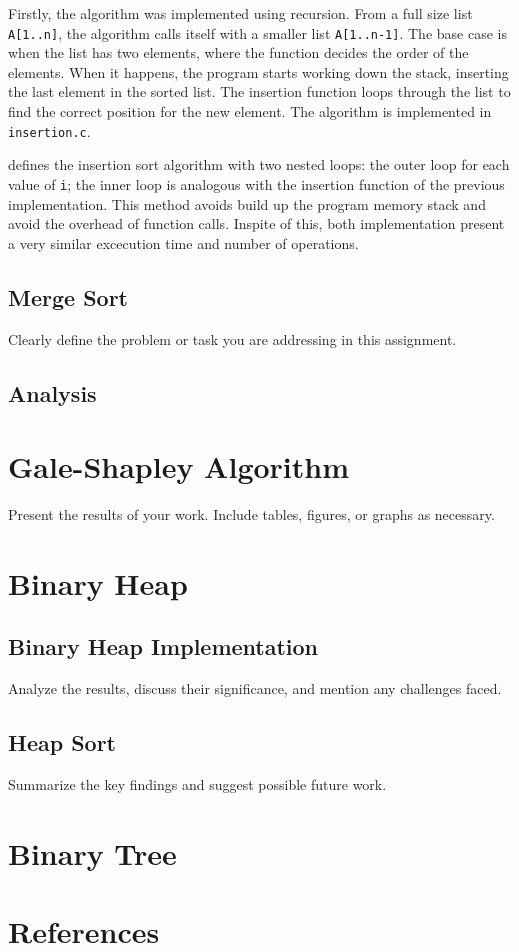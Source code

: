 \documentclass[a4paper,12pt,twocolumn]{article}
\begin{document}
Firstly, the algorithm was implemented using recursion. From a full size list \verb|A[1..n]|, the algorithm calls itself with a smaller list \verb|A[1..n-1]|. The base case is when the list has two elements, where the function decides the order of the elements. When it happens, the program starts working down the stack, inserting the last element in the sorted list. The insertion function loops through the list to find the correct position for the new element. The algorithm is implemented in \verb|insertion.c|.

\textcite{cormenIntroductionAlgorithms2022} defines the insertion sort algorithm with two nested loops: the outer loop for each value of \verb|i|; the inner loop is analogous with the insertion function of the previous implementation. This method avoids build up the program memory stack and avoid the overhead of function calls. Inspite of this, both implementation present a very similar excecution time and number of operations.

\subsection{Merge Sort}
\label{sec:merge-sort}
Clearly define the problem or task you are addressing in this assignment.

\subsection{Analysis}
\label{sec:benchmark}


\section{Gale-Shapley Algorithm}
\label{sec:gale-shapley}
Present the results of your work. Include tables, figures, or graphs as necessary.

\section{Binary Heap}
\label{sec:binary-heap}
\subsection{Binary Heap Implementation}
Analyze the results, discuss their significance, and mention any challenges faced.

\subsection{Heap Sort}
Summarize the key findings and suggest possible future work.


\section{Binary Tree}
\label{sec:binary-tree}

\section*{References}
\printbibliography
\end{document}
